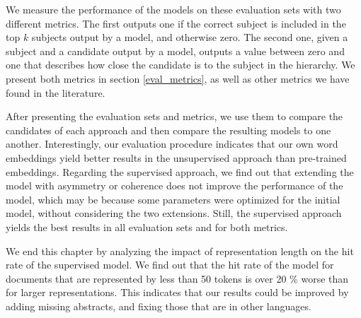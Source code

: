 We measure the performance of the models on these evaluation sets with two different metrics. The first outputs one if the correct subject is included in the top $k$ subjects output by a model, and otherwise zero. The second one, given a subject and a candidate output by a model, outputs a value between zero and one that describes how close the candidate is to the subject in the hierarchy. We present both metrics in section \ref{eval_metrics}, as well as other metrics we have found in the literature.

After presenting the evaluation sets and metrics, we use them to compare the candidates of each approach and then compare the resulting models to one another. Interestingly, our evaluation procedure indicates that our own word embeddings yield better results in the unsupervised approach than pre-trained embeddings. Regarding the supervised approach, we find out that extending the model with asymmetry or coherence does not improve the performance of the model, which may be because some parameters were optimized for the initial model, without considering the two extensions. Still, the supervised approach yields the best results in all evaluation sets and for both metrics.

We end this chapter by analyzing the impact of representation length on the hit rate of the supervised model. We find out that the hit rate of the model for documents that are represented by less than 50 tokens is over 20 \% worse than for larger representations. This indicates that our results could be improved by adding missing abstracts, and fixing those that are in other languages.







